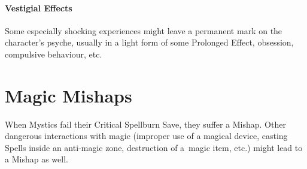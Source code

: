 \documentclass[itdr/core]{subfiles}
\begin{document}
\skipline[0.5\baselineskip]

\paragraph{Vestigial Effects}
Some especially shocking experiences might leave a permanent mark on the character's psyche, usually in a light form of some Prolonged Effect, obsession, compulsive behaviour, etc.


\vfill
\break


\section{Magic Mishaps}
\label{sec:magic_mishaps}

When Mystics fail their Critical Spellburn Save, they suffer a Mishap. Other dangerous \mbox{interactions} with magic (improper use of a magical device, casting Spells inside an anti-magic zone, destruction of a~magic item, etc.) might lead to a Mishap as well.
\end{document}
